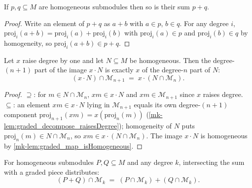 \begin{lemma}\label{mk-lem:graded_sup_isHomogeneous}
  \leanok

  If \(p, q \subseteq M\) are homogeneous submodules then so is their sum \(p + q\).
\end{lemma}

\begin{proof}
  \leanok
  Write an element of \(p + q\) as \(a + b\) with \(a \in p\), \(b \in q\). For any
  degree \(i\), \(\mathrm{proj}_i(a+b) = \mathrm{proj}_i(a) + \mathrm{proj}_i(b)\)
  with \(\mathrm{proj}_i(a) \in p\) and \(\mathrm{proj}_i(b) \in q\) by homogeneity,
  so \(\mathrm{proj}_i(a+b) \in p + q\).
\end{proof}

\begin{lemma}\label{mk-lem:graded_map_inf_degree_eq}
  \leanok

  Let \(x\) raise degree by one and let \(N \subseteq M\) be homogeneous. Then the
  degree-\((n+1)\) part of the image \(x \cdot N\) is exactly \(x\) of the
  degree-\(n\) part of \(N\):
  \[
    (x \cdot N) \cap \mathcal{M}_{n+1} \;=\; x \cdot (N \cap \mathcal{M}_n) .
  \]
\end{lemma}

\begin{proof}
  \leanok
  \(\supseteq\): for \(m \in N \cap \mathcal{M}_n\), \(x m \in x \cdot N\) and \(x m
  \in \mathcal{M}_{n+1}\) since \(x\) raises degree. \(\subseteq\): an element \(x m
  \in x \cdot N\) lying in \(\mathcal{M}_{n+1}\) equals its own degree-\((n+1)\)
  component \(\mathrm{proj}_{n+1}(x m) = x(\mathrm{proj}_n(m))\)
  (\ref{mk-lem:graded_decompose_raisesDegree}); homogeneity of \(N\) puts
  \(\mathrm{proj}_n(m) \in N \cap \mathcal{M}_n\), so \(x m \in x \cdot (N \cap
  \mathcal{M}_n)\). The image \(x \cdot N\) is homogeneous by
  \ref{mk-lem:graded_map_isHomogeneous}.
\end{proof}

\begin{lemma}\label{mk-lem:graded_sup_inf_degree_eq}
  \leanok

  For homogeneous submodules \(P, Q \subseteq M\) and any degree \(k\), intersecting
  the sum with a graded piece distributes:
  \[
    (P + Q) \cap \mathcal{M}_k \;=\; (P \cap \mathcal{M}_k) + (Q \cap \mathcal{M}_k) .
  \]
\end{lemma}

